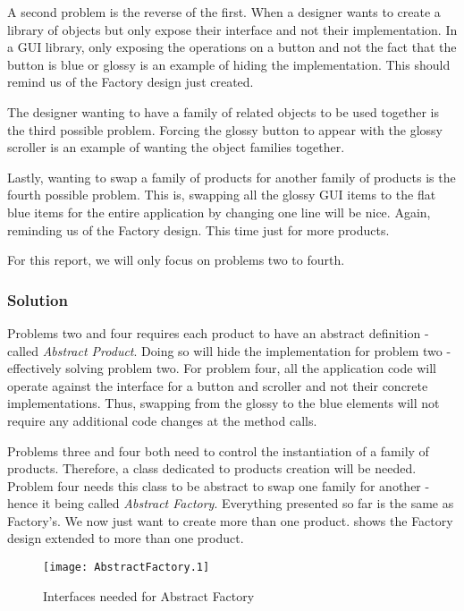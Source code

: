 A second problem is the reverse of the first.
When a designer wants to create a library of objects but only expose their interface and not their implementation.
In a GUI library, only exposing the operations on a button and not the fact that the button is blue or glossy is an example of hiding the implementation.
This should remind us of the Factory design just created.

The designer wanting to have a family of related objects to be used together is the third possible problem.
Forcing the glossy button to appear with the glossy scroller is an example of wanting the object families together.

Lastly, wanting to swap a family of products for another family of products is the fourth possible problem.
This is, swapping all the glossy GUI items to the flat blue items for the entire application by changing one line will be nice.
Again, reminding us of the Factory design.
This time just for more products.

For this report, we will only focus on problems two to fourth.

\subsubsection{Solution}
Problems two and four requires each product to have an abstract definition - called \textit{Abstract Product}.
Doing so will hide the implementation for problem two - effectively solving problem two.
For problem four, all the application code will operate against the interface for a button and scroller and not their concrete implementations.
Thus, swapping from the glossy to the blue elements will not require any additional code changes at the method calls.

Problems three and four both need to control the instantiation of a family of products.
Therefore, a class dedicated to products creation will be needed.
Problem four needs this class to be abstract to swap one family for another - hence it being called \textit{Abstract Factory}.
Everything presented so far is the same as Factory's.
We now just want to create more than one product.
 shows the Factory design extended to more than one product.

\begin{figure}[h]
	\centering
	\texttt{[image: AbstractFactory.1]}
	\caption{Interfaces needed for Abstract Factory}
	\label{fig:AbstractFactoryInterface}
\end{figure}


